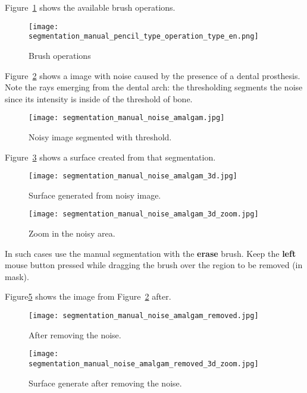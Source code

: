 Figure~\ref{fig:select_brush_operations} shows the available brush operations.

\begin{figure}[!htb]
\centering
\texttt{[image: segmentation\_manual\_pencil\_type\_operation\_type\_en.png]}
\caption{Brush operations}
\label{fig:select_brush_operations}
\end{figure}

Figure~\ref{fig:noise_amalgaman} shows a image with noise caused by the presence of a dental prosthesis. Note the rays emerging from the dental arch: the thresholding segments the noise since its intensity is inside of the threshold of bone.

\begin{figure}[!htb]
\centering
\texttt{[image: segmentation\_manual\_noise\_amalgam.jpg]}
\caption{Noisy image segmented with threshold.}
\label{fig:noise_amalgaman}
\end{figure}

Figure~\ref{fig:surface_amagaman} shows a surface created from that segmentation.

\begin{figure}[!htb]
\centering
\texttt{[image: segmentation\_manual\_noise\_amalgam\_3d.jpg]}
\caption{Surface generated from noisy image.}
\label{fig:surface_amagaman}
\end{figure}

\begin{figure}[!htb]
\centering
\texttt{[image: segmentation\_manual\_noise\_amalgam\_3d\_zoom.jpg]}
\caption{Zoom in the noisy area.}
\label{fig:surface_amagaman_zoom}
\end{figure}

In such cases use the manual segmentation with the \textbf{erase} brush. Keep the \textbf{left} mouse button pressed while dragging the brush over the region to be removed (in mask).

Figure\ref{fig:editor_amalgaman} shows the image from Figure~\ref{fig:noise_amalgaman} after.

\begin{figure}[!htb]
\centering
\texttt{[image: segmentation\_manual\_noise\_amalgam\_removed.jpg]}
\caption{After removing the noise.}
\label{fig:editor_amalgaman}
\end{figure}

\begin{figure}[!htb]
\centering
\texttt{[image: segmentation\_manual\_noise\_amalgam\_removed\_3d\_zoom.jpg]}
\caption{Surface generate after removing the noise.}
\label{fig:surface_edited_amalgaman}
\end{figure}

